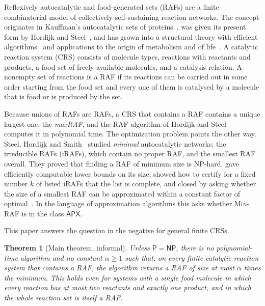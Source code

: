 \documentclass[11pt,a4paper]{article}
\theoremstyle{plain}
\newtheorem{theorem}{Theorem}[section]
\theoremstyle{definition}
\theoremstyle{remark}
\newcommand{\MinRAF}{\textup{\textsc{Min-RAF}}}
\newcommand{\NP}{\mathsf{NP}}
\newcommand{\Ptime}{\mathsf{P}}
\begin{document}
Reflexively autocatalytic and food-generated sets (RAFs) are a finite combinatorial model of collectively self-sustaining reaction networks. The concept originates in Kauffman's autocatalytic sets of proteins~\cite{kauffman1986autocatalytic,kauffman1993origins}, was given its present form by Hordijk and Steel~\cite{hordijk2004detecting}, and has grown into a structural theory with efficient algorithms~\cite{hordijk2012structure,hordijk2015algorithms,steel2019autocatalytic,steel2020structure} and applications to the origin of metabolism and of life~\cite{hordijk2017chasing,hordijk2018life,xavier2020autocatalytic}. A catalytic reaction system (CRS) consists of molecule types, reactions with reactants and products, a food set of freely available molecules, and a catalysis relation. A nonempty set of reactions is a RAF if its reactions can be carried out in some order starting from the food set and every one of them is catalysed by a molecule that is food or is produced by the set.

Because unions of RAFs are RAFs, a CRS that contains a RAF contains a unique largest one, the \emph{maxRAF}, and the RAF algorithm of Hordijk and Steel~\cite{hordijk2004detecting} computes it in polynomial time. The optimization problem points the other way. Steel, Hordijk and Smith~\cite{steel2013minimal} studied \emph{minimal} autocatalytic networks: the irreducible RAFs (iRAFs), which contain no proper RAF, and the smallest RAF overall. They proved that finding a RAF of minimum size is NP-hard, gave efficiently computable lower bounds on its size, showed how to certify for a fixed number $k$ of listed iRAFs that the list is complete, and closed by asking whether the size of a smallest RAF can be approximated within a constant factor of optimal~\cite{steel2013minimal}. In the language of approximation algorithms this asks whether \MinRAF{} is in the class $\mathsf{APX}$.

This paper answers the question in the negative for general finite CRSs.

\begin{theorem}[Main theorem, informal]\label{thm:main-intro}
Unless $\Ptime=\NP$, there is no polynomial-time algorithm and no constant $\alpha\ge 1$ such that, on every finite catalytic reaction system that contains a RAF, the algorithm returns a RAF of size at most $\alpha$ times the minimum. This holds even for systems with a single food molecule in which every reaction has at most two reactants and exactly one product, and in which the whole reaction set is itself a RAF.
\end{theorem}
\end{document}
